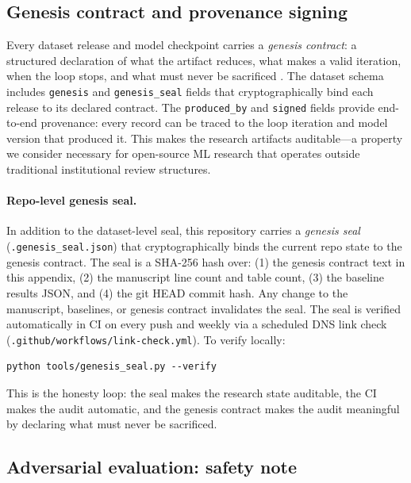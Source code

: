 \subsection{Genesis contract and provenance signing}
\label{sec:disclaimer:genesis}

Every dataset release and model checkpoint carries a \emph{genesis
contract}: a structured declaration of what the artifact reduces, what makes
a valid iteration, when the loop stops, and what must never be sacrificed
\citep{vaked2024genesis}. The dataset schema includes \texttt{genesis} and
\texttt{genesis\_seal} fields that cryptographically bind each release to
its declared contract. The \texttt{produced\_by} and \texttt{signed} fields
provide end-to-end provenance: every record can be traced to the loop
iteration and model version that produced it. This makes the research
artifacts auditable---a property we consider necessary for open-source ML
research that operates outside traditional institutional review structures.

\paragraph{Repo-level genesis seal.} In addition to the dataset-level seal,
this repository carries a \emph{genesis seal} (\texttt{.genesis\_seal.json})
that cryptographically binds the current repo state to the genesis contract.
The seal is a SHA-256 hash over: (1) the genesis contract text in this
appendix, (2) the manuscript line count and table count, (3) the baseline
results JSON, and (4) the git HEAD commit hash. Any change to the manuscript,
baselines, or genesis contract invalidates the seal. The seal is verified
automatically in CI on every push and weekly via a scheduled DNS link check
(\texttt{.github/workflows/link-check.yml}). To verify locally:
\begin{verbatim}
python tools/genesis_seal.py --verify
\end{verbatim}
This is the honesty loop: the seal makes the research state auditable, the
CI makes the audit automatic, and the genesis contract makes the audit
meaningful by declaring what must never be sacrificed.

\subsection{Adversarial evaluation: safety note}
\label{sec:disclaimer:heretic}

